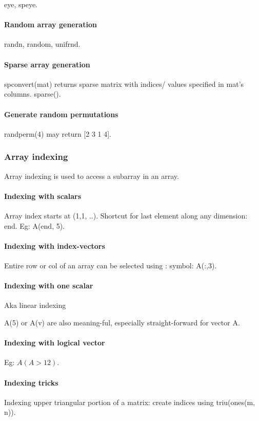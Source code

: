 \documentclass[oneside, article]{memoir}
\begin{document}
eye, speye.

\paragraph*{Random array generation}
randn, random, unifrnd.

\paragraph*{Sparse array generation}
spconvert(mat) returns sparse matrix with indices/ values specified in mat's columns. sparse().

\paragraph*{Generate random permutations}
randperm(4) may return [2 3 1 4].

\subsubsection{Array indexing}
Array indexing is used to access a subarray in an array.

\paragraph*{Indexing with scalars}
Array index starts at (1,1, ..). Shortcut for last element along any dimension: end. Eg: A(end, 5).

\paragraph*{Indexing with index-vectors}
Entire row or col of an array can be selected using : symbol: A(:,3).

\paragraph*{Indexing with one scalar}
Aka linear indexing

A(5) or A(v) are also meaning-ful, especially straight-forward for vector A.

\paragraph*{Indexing with logical vector}
Eg: $A(A>12)$.

\paragraph*{Indexing tricks}
Indexing upper triangular portion of a matrix: create indices using triu(ones(m, n)).
\end{document}
